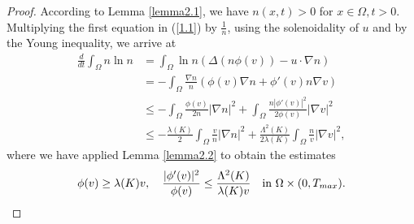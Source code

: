 \documentclass[12pt]{article}
\theoremstyle{plain}
\theoremstyle{definition}
\numberwithin{equation}{section}
\begin{document}
\begin{proof} According to Lemma  \ref{lemma2.1}, we have $n(x,t)>0$ for $x\in \Omega,t>0$.  Multiplying the first equation in (\ref{1.1}) by $\frac1{n}$,  using the solenoidality of $u$ and by the Young inequality,
we arrive at
\begin{equation}\label{3.2}
\begin{split}
\frac d{dt}\int_\Omega n\ln n
&=\int_\Omega\ln n
(\Delta (n\phi(v))-u\cdot\nabla n)\\
&=-\int_\Omega\frac{\nabla n}{n}
(\phi(v) \nabla n+\phi'(v)n \nabla v )\\
&\leq -\int_\Omega \frac{\phi(v)} {2n}|\nabla n|^2+
\int_\Omega \frac{n|\phi'(v)|^2} {2\phi(v)} |\nabla v|^2\\
&\leq- \frac{\lambda(K)} 2\int_\Omega\frac{v}{n}|\nabla n|^2
+
\frac{\Lambda^2(K)}{2\lambda(K)}\int_\Omega \frac nv |\nabla v|^2,
\end{split}
\end{equation}
where we have applied Lemma \ref{lemma2.2} to obtain the estimates
$$
\phi(v)\geq \lambda(K)v, \quad \frac{|\phi'(v)|^2} {\phi(v)}\leq \frac{\Lambda^2(K)}{\lambda(K)v}\quad \hbox{in}\,
\,\Omega\times (0,T_{max}).
$$
\end{proof}
\end{document}
